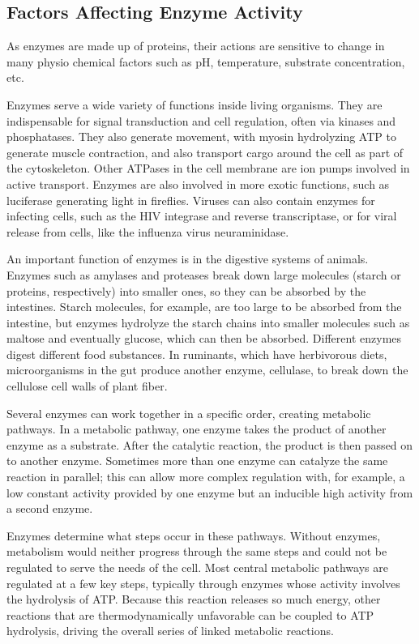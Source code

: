 \hypertarget{factors-affecting-enzyme-activity}{%
\subsection{Factors Affecting Enzyme Activity}\label{factors-affecting-enzyme-activity}}

As enzymes are made up of proteins, their actions are sensitive to change in many physio chemical factors such as pH, temperature, substrate concentration, etc.

Enzymes serve a wide variety of functions inside living organisms. They are indispensable for signal transduction and cell regulation, often via kinases and phosphatases. They also generate movement, with myosin hydrolyzing ATP to generate muscle contraction, and also transport cargo around the cell as part of the cytoskeleton. Other ATPases in the cell membrane are ion pumps involved in active transport. Enzymes are also involved in more exotic functions, such as luciferase generating light in fireflies. Viruses can also contain enzymes for infecting cells, such as the HIV integrase and reverse transcriptase, or for viral release from cells, like the influenza virus neuraminidase.

An important function of enzymes is in the digestive systems of animals. Enzymes such as amylases and proteases break down large molecules (starch or proteins, respectively) into smaller ones, so they can be absorbed by the intestines. Starch molecules, for example, are too large to be absorbed from the intestine, but enzymes hydrolyze the starch chains into smaller molecules such as maltose and eventually glucose, which can then be absorbed. Different enzymes digest different food substances. In ruminants, which have herbivorous diets, microorganisms in the gut produce another enzyme, cellulase, to break down the cellulose cell walls of plant fiber.

Several enzymes can work together in a specific order, creating metabolic pathways. In a metabolic pathway, one enzyme takes the product of another enzyme as a substrate. After the catalytic reaction, the product is then passed on to another enzyme. Sometimes more than one enzyme can catalyze the same reaction in parallel; this can allow more complex regulation with, for example, a low constant activity provided by one enzyme but an inducible high activity from a second enzyme.

Enzymes determine what steps occur in these pathways. Without enzymes, metabolism would neither progress through the same steps and could not be regulated to serve the needs of the cell. Most central metabolic pathways are regulated at a few key steps, typically through enzymes whose activity involves the hydrolysis of ATP. Because this reaction releases so much energy, other reactions that are thermodynamically unfavorable can be coupled to ATP hydrolysis, driving the overall series of linked metabolic reactions.

